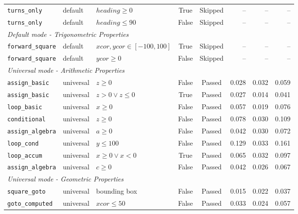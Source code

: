 {\begin{longtable}{p{} p{} p{} c c r r r}
\texttt{turns\_only}     & default & $\mathit{heading}\geq 0$            & True  & Skipped & --    & --    & --    \\
\texttt{turns\_only}     & default & $\mathit{heading}\leq 90$           & False & Skipped & --    & --    & --    \\
\midrule
\multicolumn{8}{l}{\textit{Default mode - Trigonometric Properties}} \\
\midrule
\texttt{forward\_square} & default & $\mathit{xcor},\mathit{ycor}\in[-100,100]$ & True  & Skipped & -- & -- & -- \\
\texttt{forward\_square} & default & $\mathit{ycor}\geq 0$                & False & Skipped & -- & -- & -- \\
\midrule
\multicolumn{8}{l}{\textit{Universal mode - Arithmetic Properties}} \\
\midrule
\texttt{assign\_basic}   & universal & $z \geq 0$                       & False & Passed & 0.028 & 0.032 & 0.059 \\
\texttt{assign\_basic}   & universal & $z{>}0\vee z{\leq}0$            & True  & Passed & 0.027 & 0.014 & 0.041 \\
\texttt{loop\_basic}     & universal & $x \geq 0$                       & False & Passed & 0.057 & 0.019 & 0.076 \\
\texttt{conditional}     & universal & $z \geq 0$                       & False & Passed & 0.078 & 0.030 & 0.109 \\
\texttt{assign\_algebra} & universal & $a \geq 0$                       & False & Passed & 0.042 & 0.030 & 0.072 \\
\texttt{loop\_cond}      & universal & $y \leq 100$                     & False & Passed & 0.129 & 0.033 & 0.161 \\
\texttt{loop\_accum}     & universal & $x{\geq}0\vee x{<}0$           & True  & Passed & 0.065 & 0.032 & 0.097 \\
\texttt{assign\_algebra} & universal & $c \geq 0$                       & False & Passed & 0.042 & 0.026 & 0.067 \\
\midrule
\multicolumn{8}{l}{\textit{Universal mode - Geometric Properties}} \\
\midrule
\texttt{square\_goto}    & universal & bounding box                     & False & Passed & 0.015 & 0.022 & 0.037 \\
\texttt{goto\_computed}  & universal & $\mathit{xcor}\leq 50$          & False & Passed & 0.033 & 0.024 & 0.057 \\

\end{longtable}}
